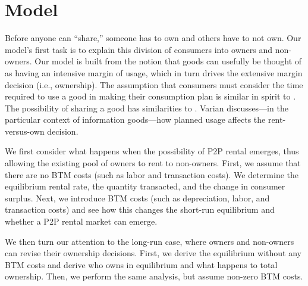 \documentclass[11pt]{article}
\begin{document}

\section{Model} \label{sec:model}

Before anyone can ``share,'' someone has to own and others have to not own.
Our model's first task is to explain this division of consumers into owners and non-owners. 
Our model is built from the notion that goods can usefully be thought of as having an intensive margin of usage, which in turn drives the extensive margin decision (i.e., ownership). 
The assumption that consumers must consider the time required to use a good in making their consumption plan is similar in spirit to \cite{becker1965theory}.
The possibility of sharing a good has similarities to \cite{varian2000}.
Varian discusses---in the particular context of information goods---how planned usage affects the rent-versus-own decision. 

We first consider what happens when the possibility of P2P rental emerges, thus allowing the existing pool of owners to rent to non-owners. 
First, we assume that there are no BTM costs (such as labor and transaction costs).
We determine the equilibrium rental rate, the quantity transacted, and the change in consumer surplus. 
Next, we introduce BTM costs (such as depreciation, labor, and transaction costs) and see how this changes the short-run equilibrium and whether a P2P rental market can emerge. 

We then turn our attention to the long-run case, where owners and non-owners can revise their ownership decisions.
First, we derive the equilibrium without any BTM costs and derive who owns in equilibrium and what happens to total ownership.
Then, we perform the same analysis, but assume non-zero BTM costs. 
\end{document}
